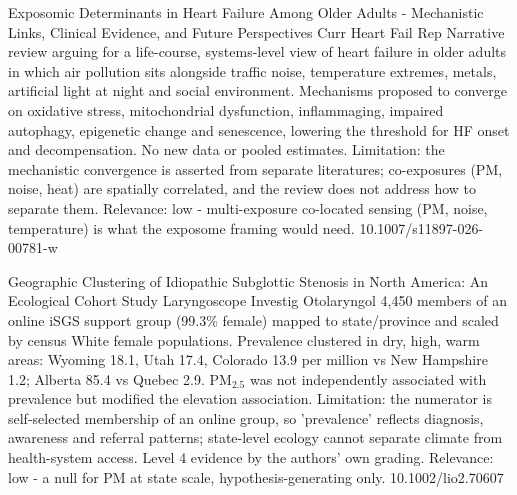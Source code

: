 \documentclass[10pt]{article}
\begin{document}
{Exposomic Determinants in Heart Failure Among Older Adults - Mechanistic Links, Clinical Evidence, and Future Perspectives}
{Curr Heart Fail Rep}
{Narrative review arguing for a life-course, systems-level view of heart failure in older adults in which air pollution sits alongside traffic noise, temperature extremes, metals, artificial light at night and social environment. Mechanisms proposed to converge on oxidative stress, mitochondrial dysfunction, inflammaging, impaired autophagy, epigenetic change and senescence, lowering the threshold for HF onset and decompensation. No new data or pooled estimates. Limitation: the mechanistic convergence is asserted from separate literatures; co-exposures (PM, noise, heat) are spatially correlated, and the review does not address how to separate them. Relevance: low - multi-exposure co-located sensing (PM, noise, temperature) is what the exposome framing would need.}
{10.1007/s11897-026-00781-w}

\par{}\baselineskip{}\baselineskip
{}

{Geographic Clustering of Idiopathic Subglottic Stenosis in North America: An Ecological Cohort Study}
{Laryngoscope Investig Otolaryngol}
{4,450 members of an online iSGS support group (99.3\% female) mapped to state/province and scaled by census White female populations. Prevalence clustered in dry, high, warm areas: Wyoming 18.1, Utah 17.4, Colorado 13.9 per million vs New Hampshire 1.2; Alberta 85.4 vs Quebec 2.9. PM$_{2.5}$ was not independently associated with prevalence but modified the elevation association. Limitation: the numerator is self-selected membership of an online group, so 'prevalence' reflects diagnosis, awareness and referral patterns; state-level ecology cannot separate climate from health-system access. Level 4 evidence by the authors' own grading. Relevance: low - a null for PM at state scale, hypothesis-generating only.}
{10.1002/lio2.70607}

\par{}\baselineskip{}\baselineskip
{}
\end{document}
